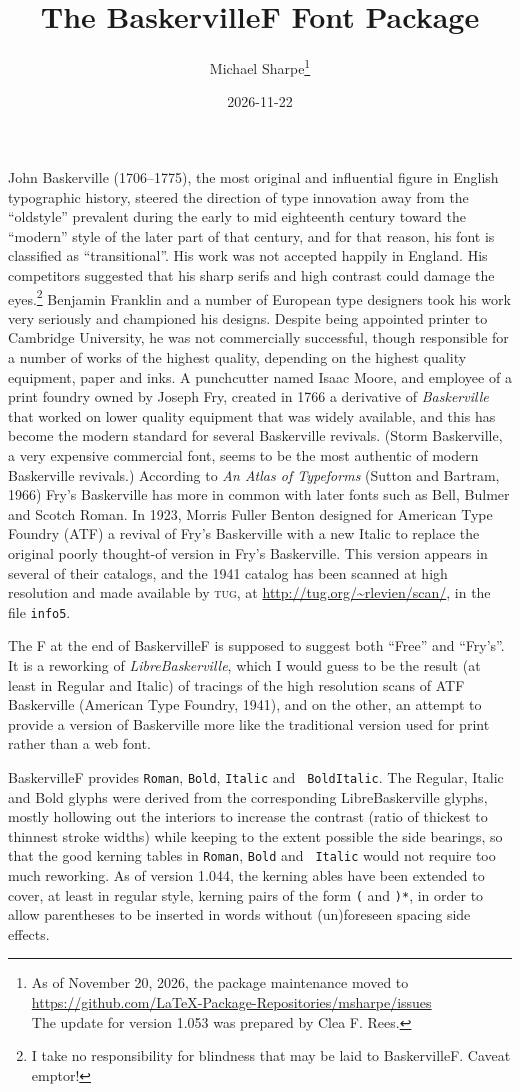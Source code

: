 \documentclass[11pt]{article}
\title{The BaskervilleF Font Package}
\author{Michael Sharpe\thanks{As of November 20, 2026, the package
    maintenance moved to\\\url{https://github.com/LaTeX-Package-Repositories/msharpe/issues}\\
    The update for version 1.053 was prepared by Clea F. Rees.}}
\date{2026-11-22}  %
\begin{document}
\maketitle
John Baskerville (1706--1775), the most original and influential figure in English typographic history, steered the direction of type innovation away from the ``oldstyle'' prevalent during the early to mid eighteenth century toward the ``modern'' style of the later part of that century, and for that reason, his font  is classified as ``transitional''. His work was not accepted happily in England. His competitors suggested that his sharp serifs and high contrast could damage the eyes.\footnote{I take no responsibility for blindness that may  be laid to BaskervilleF. Caveat emptor!} Benjamin Franklin and a number of European type designers took his work very seriously and championed his designs. Despite being appointed printer to Cambridge University, he was not commercially successful, though responsible for a number of works of the highest quality, depending on the highest quality equipment, paper and inks. A punchcutter named Isaac Moore, and employee of a print foundry owned by Joseph Fry, created in 1766 a derivative of \emph{Baskerville} that worked on lower quality equipment that was widely available, and this has become the modern standard for several 
Baskerville revivals. (Storm Baskerville, a very expensive commercial font, seems to be the most authentic of modern Baskerville revivals.) According to \emph{An Atlas of Typeforms} (Sutton and Bartram, 1966) Fry's Baskerville has more in common with later fonts such as Bell, Bulmer and Scotch Roman.  In 1923, Morris Fuller Benton designed for American Type Foundry (ATF) a revival of Fry's Baskerville with a new Italic to replace the original poorly thought-of version in Fry's Baskerville. This version appears in several of their catalogs, and the 1941 catalog has been scanned at high resolution and made available by \textsc{tug}, at \url{http://tug.org/~rlevien/scan/}, in the file {\tt info5}.

The F at the end of BaskervilleF is supposed to suggest both ``Free'' and ``Fry's''. It is  a reworking of \emph{LibreBaskerville}, which I would guess to be the result (at least in Regular and Italic) of  tracings of the high resolution scans of ATF Baskerville (American Type Foundry, 1941), and on the other, an attempt to provide a version of Baskerville more like the traditional version used for print rather than a web font. 

BaskervilleF provides {\tt Roman}, {\tt Bold}, {\tt Italic} and {\tt
  BoldItalic}. The Regular, Italic and Bold glyphs were derived from
the corresponding LibreBaskerville glyphs, mostly hollowing out the
interiors to increase the contrast (ratio of thickest to thinnest
stroke widths) while keeping to the extent possible the side bearings,
so that the good kerning tables in {\tt Roman}, {\tt Bold} and {\tt
  Italic} would not require too much reworking. As of version 1.044,
the kerning ables have been extended to cover, at least in regular
style, kerning pairs of the form {\tt*(} and {\tt)*}, in order to
allow parentheses to be inserted in words without (un)foreseen spacing
side effects.
\end{document}
